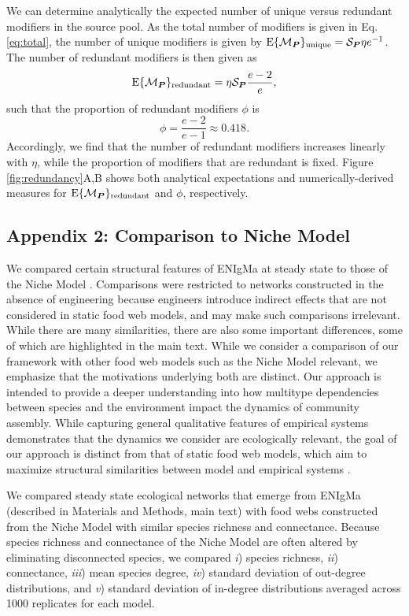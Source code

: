 \documentclass[twocolumn,preprintnumbers,amsmath,amssymb,superscriptaddress,linenumbers]{revtex4-1}
\newcommand{\rr}[1]{{\rm #1}}
\begin{document}
We can determine analytically the expected number of unique versus redundant modifiers in the source pool.
As the total number of modifiers is given in Eq. \ref{eq:total}, the number of unique modifiers is given by ${\rm E}\{\mathcal{M}_{\bm P}\}_{\rr{unique}} = \mathcal{S}_{\bm P} \eta e^{-1}$.
The number of redundant modifiers is then given as
\begin{equation}
{\rm E}\{\mathcal{M}_{\bm P}\}_{\rr{redundant}} = \eta \mathcal{S}_{\bm P} \frac{e - 2}{e},
\label{eq:redundant}
\end{equation}
such that the proportion of redundant modifiers $\phi$ is
\begin{equation}
\phi = \frac{e-2}{e-1} \approx 0.418.
\label{eq:redundantprop}
\end{equation}
Accordingly, we find that the number of redundant modifiers increases linearly with $\eta$, while the proportion of modifiers that are redundant is fixed.
Figure \ref{fig:redundancy}A,B shows both analytical expectations and numerically-derived measures for ${\rm E}\{\mathcal{M}_{\bm P}\}_{\rr{redundant}}$ and $\phi$, respectively.

\subsection*{Appendix 2: Comparison to Niche Model}
We compared certain structural features of ENIgMa at steady state to those of the Niche Model \cite{Williams2000}.
Comparisons were restricted to networks constructed in the absence of engineering because engineers introduce indirect effects that are not considered in static food web models, and may make such comparisons irrelevant.
While there are many similarities, there are also some important differences, some of which are highlighted in the main text.
While we consider a comparison of our framework with other food web models such as the Niche Model relevant, we emphasize that the motivations underlying both are distinct.
Our approach is intended to provide a deeper understanding into how multitype dependencies between species and the environment impact the dynamics of community assembly.
While capturing general qualitative features of empirical systems demonstrates that the dynamics we consider are ecologically relevant, the goal of our approach is distinct from that of static food web models, which aim to maximize structural similarities between model and empirical systems \cite{Williams2000,Williams2011}.

We compared steady state ecological networks that emerge from ENIgMa (described in Materials and Methods, main text) with food webs constructed from the Niche Model \cite{Williams2000} with similar species richness and connectance.
Because species richness and connectance of the Niche Model are often altered by eliminating disconnected species, we compared
\emph{i}) species richness,
\emph{ii}) connectance,
\emph{iii}) mean species degree,
\emph{iv}) standard deviation of out-degree distributions, and
\emph{v}) standard deviation of in-degree distributions
averaged across 1000 replicates for each model.
\end{document}
